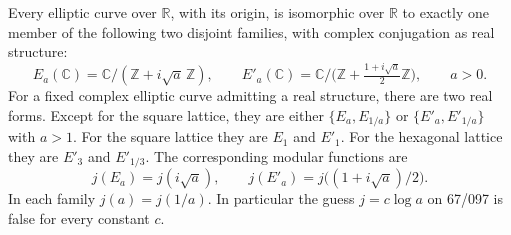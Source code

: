 \begin{theorem}
\label{A:real-elliptic}
Every elliptic curve over $\mathbb R$, with its origin, is isomorphic
over $\mathbb R$ to exactly one member of the following two disjoint
families, with complex conjugation as real structure:
\[
 E_a(\mathbb C)=\mathbb C/(\mathbb Z+i\sqrt a\,\mathbb Z),
 \qquad
 E'_a(\mathbb C)=\mathbb C/
       \bigl(\mathbb Z+\tfrac{1+i\sqrt a}{2}\mathbb Z\bigr),
 \qquad a>0.
\]
For a fixed complex elliptic curve admitting a real structure, there
are two real forms. Except for the square lattice, they are either
$\{E_a,E_{1/a}\}$ or $\{E'_a,E'_{1/a}\}$ with $a>1$.
For the square lattice they are $E_1$ and $E'_1$.
For the hexagonal lattice they are $E'_3$ and $E'_{1/3}$.
The corresponding modular functions are
\[
 j(E_a)=j(i\sqrt a),\qquad
 j(E'_a)=j\bigl((1+i\sqrt a)/2\bigr).
\]
In each family $j(a)=j(1/a)$. In particular the guess
$j=c\log a$ on 67/097 is false for every constant $c$.
\end{theorem}

